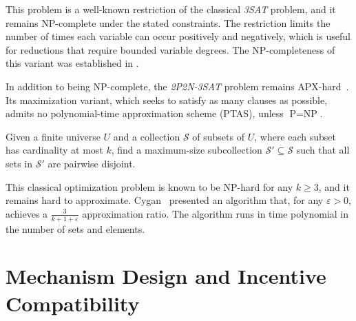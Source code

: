 This problem is a well-known restriction of the classical \textit{3SAT} problem, and it remains NP-complete under the stated constraints. The restriction limits the number of times each variable can occur positively and negatively, which is useful for reductions that require bounded variable degrees. The NP-completeness of this variant was established in \cite{berman2004approximation}.

In addition to being NP-complete, the \textit{2P2N-3SAT} problem remains APX-hard~\cite{berman2004approximation}. Its maximization variant, which seeks to satisfy as many clauses as possible, admits no polynomial-time approximation scheme (PTAS), unless $\text{P} = \text{NP}$.


\begin{problem}
\label{prob:k_set_packing}

Given a finite universe $U$ and a collection $\mathcal{S}$ of subsets of $U$, where each subset has cardinality at most $k$, find a maximum-size subcollection $\mathcal{S}' \subseteq \mathcal{S}$ such that all sets in $\mathcal{S}'$ are pairwise disjoint.
\end{problem}

This classical optimization problem is known to be NP-hard for any $k \geq 3$, and it remains hard to approximate. Cygan~\cite{cygan2013improved} presented an algorithm that, for any $\varepsilon > 0$, achieves a $\frac{3}{k + 1 + \varepsilon}$ approximation ratio. The algorithm runs in time polynomial in the number of sets and elements.





\section{Mechanism Design and Incentive Compatibility}

